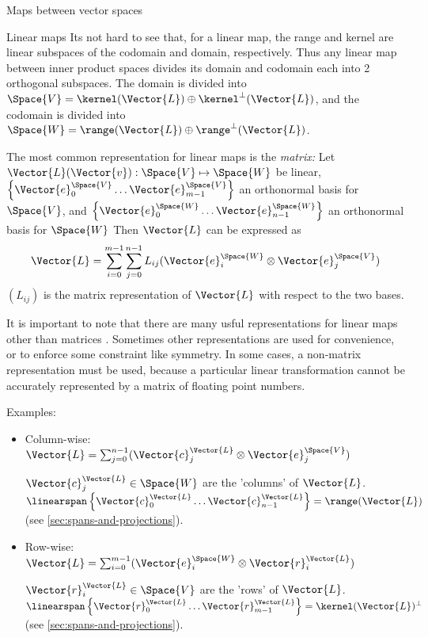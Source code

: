 \begin{plSection}{Maps between vector spaces}
\begin{plSection}{Linear maps}
Its not hard to see that, for a linear map,
the range and kernel are linear subspaces of the codomain and
domain, respectively.
Thus any linear map between inner product spaces
divides its domain and codomain each into 2 orthogonal subspaces.
The domain is divided into $\Space{V} = \kernel(\Vector{L}) \oplus \kernel^{\perp}(\Vector{L})$,
and the codomain is divided into $\Space{W} = \range(\Vector{L}) \oplus \range^{\perp}(\Vector{L})$.

The most common representation for linear maps is the {\it matrix:}
Let $\Vector{L}(\Vector{v}):\Space{V} \mapsto \Space{W}$ be linear,
$\left\{ \Vector{e}_0^{\Space{V}} \ldots  \Vector{e}_{m-1}^{\Space{V}} \right\}$ an orthonormal basis for $\Space{V}$,
and
$\left\{ \Vector{e}_0^{\Space{W}} \ldots \Vector{e}_{n-1}^{\Space{W}} \right\}$ an orthonormal  basis for $\Space{W}$
Then $\Vector{L}$ can be expressed as
\begin{equation}
\Vector{L}
 =
\sum_{i=0}^{m-1} \sum_{j=0}^{n-1} L_{ij} ( \Vector{e}_i^{\Space{W}} \otimes \Vector{e}_j^{\Space{V}} )
\end{equation}
$(L_{ij})$ is the matrix representation of $\Vector{L}$ with respect to
the two bases\cite{Halmos:1958:Finite}.

It is important to note that there are many usful
representations for linear maps other than matrices \cite{McDonald:1989:OOPSLA}.
Sometimes other representations are used for convenience,
or to enforce some constraint like symmetry.
In some cases, a non-matrix representation must be used,
because a particular linear transformation
cannot be accurately represented by a matrix of floating point numbers.

Examples:

\begin{itemize}

\item Column-wise:
$\Vector{L} = 
\sum_{j=0}^{n-1} ( \Vector{c}_j^{\Vector{L}} 
\otimes \Vector{e}_j^{\Space{V}} )$

$\Vector{c}_j^{\Vector{L}} \in \Space{W}$ 
are the 'columns' of $\Vector{L}$.
$\linearspan\left\{ \Vector{c}_0^{\Vector{L}} 
\ldots \Vector{c}_{n-1}^{\Vector{L}} \right\} 
= \range(\Vector{L})$
(see \cref{sec:spans-and-projections}).

\item Row-wise:
$\Vector{L} = \sum_{i=0}^{m-1} ( \Vector{e}_i^{\Space{W}} \otimes  \Vector{r}_i^{\Vector{L}} )$

$\Vector{r}_i^{\Vector{L}} \in \Space{V}$ are the 'rows' of $\Vector{L}$.
$\linearspan\left\{ \Vector{r}_0^{\Vector{L}} \ldots \Vector{r}_{m-1}^{\Vector{L}} \right\} =  \kernel(\Vector{L})^{\perp}$
(see \cref{sec:spans-and-projections}).


\end{itemize}
\end{plSection}
\end{plSection}
